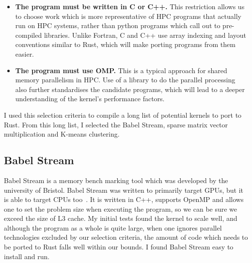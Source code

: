 \begin{itemize}
  \item \textbf{The program must be written in C or C++.} This restriction allows us to choose work which is more representative of HPC programs that actually run on HPC systems, rather than python programs which call out to pre-compiled libraries. Unlike Fortran, C and C++ use array indexing and layout conventions similar to Rust, which will make porting programs from them easier.

  \item \textbf{The program must use OMP.} This is a typical approach for shared memory parallelism in HPC\@. Use of a library to do the parallel processing also further standardises the candidate programs, which will lead to a deeper understanding of the kernel's performance factors.
\end{itemize}

I used this selection criteria to compile a long list of potential kernels to port to Rust. From this long list, I selected the Babel Stream, sparse matrix vector multiplication and K-means clustering.

\subsection{Babel Stream}

Babel Stream is a memory bench marking tool which was developed by the university of Bristol. Babel Stream was written to primarily target GPUs, but it is able to target CPUs too~\cite{BabelStream}.  It is written in C++, supports OpenMP and allows one to set the problem size when executing the program, so we can be sure we exceed the size of L3 cache. My initial tests found the kernel to scale well, and although the program as a whole is quite large, when one ignores parallel technologies excluded by our selection criteria, the amount of code which needs to be ported to Rust falls well within our bounds. I found Babel Stream easy to install and run.

